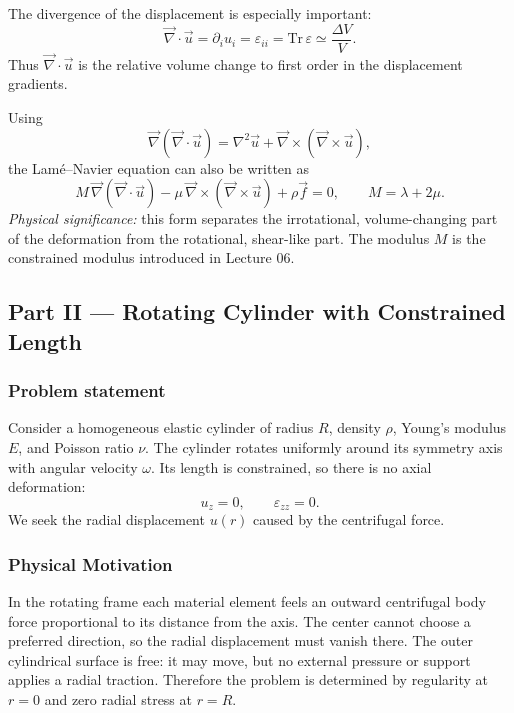 \documentclass[../main.tex]{subfiles}
\begin{document}
The divergence of the displacement is especially important:
\begin{equation}
    \vec{\nabla}\cdot\vec{u}
    = \partial_i u_i
    = \varepsilon_{ii}
    = \mathrm{Tr}\,\varepsilon
    \simeq \frac{\Delta V}{V}.
    \label{eq:lec07_div_volume_change}
\end{equation}
Thus $\vec{\nabla}\cdot\vec{u}$ is the relative volume change to first order in the displacement gradients.

Using
\begin{equation}
    \vec{\nabla}(\vec{\nabla}\cdot\vec{u})
    = \nabla^2\vec{u}
      +\vec{\nabla}\times(\vec{\nabla}\times\vec{u}),
    \label{eq:lec07_curl_identity}
\end{equation}
the Lamé--Navier equation can also be written as
\begin{equation}
    \boxed{
    M\,\vec{\nabla}(\vec{\nabla}\cdot\vec{u})
    -\mu\,\vec{\nabla}\times(\vec{\nabla}\times\vec{u})
    +\rho\vec{f}=0,}
    \qquad
    M=\lambda+2\mu.
    \label{eq:lec07_lame_navier_curl_static}
\end{equation}
\textit{Physical significance:} this form separates the irrotational, volume-changing part of the deformation from the rotational, shear-like part. The modulus $M$ is the constrained modulus introduced in Lecture 06.

\subsection*{Part II — Rotating Cylinder with Constrained Length}

\subsubsection*{Problem statement}

Consider a homogeneous elastic cylinder of radius $R$, density $\rho$, Young's modulus $E$, and Poisson ratio $\nu$. The cylinder rotates uniformly around its symmetry axis with angular velocity $\omega$. Its length is constrained, so there is no axial deformation:
\[
    u_z=0,
    \qquad
    \varepsilon_{zz}=0.
\]
We seek the radial displacement $u(r)$ caused by the centrifugal force.

\subsubsection*{Physical Motivation}
In the rotating frame each material element feels an outward centrifugal body force proportional to its distance from the axis. The center cannot choose a preferred direction, so the radial displacement must vanish there. The outer cylindrical surface is free: it may move, but no external pressure or support applies a radial traction. Therefore the problem is determined by regularity at $r=0$ and zero radial stress at $r=R$.
\end{document}
